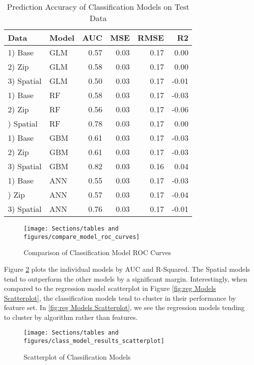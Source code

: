 \documentclass[12pt,]{article}
\begin{document}
\begin{table}

\caption{\label{tab:Class Model Compare}\label{tab:ClassModelTable} Prediction Accuracy of Classification Models on Test Data}
\centering
\begin{tabular}[t]{llrrrr}
\toprule
Data & Model & AUC & MSE & RMSE & R2\\
\midrule
1) Base & GLM & 0.57 & 0.03 & 0.17 & 0.00\\
2) Zip & GLM & 0.58 & 0.03 & 0.17 & 0.00\\
3) Spatial & GLM & 0.50 & 0.03 & 0.17 & -0.01\\
1) Base & RF & 0.58 & 0.03 & 0.17 & -0.03\\
2) Zip & RF & 0.56 & 0.03 & 0.17 & -0.06\\
\addlinespace
3) Spatial & RF & 0.78 & 0.03 & 0.17 & 0.00\\
1) Base & GBM & 0.61 & 0.03 & 0.17 & -0.03\\
2) Zip & GBM & 0.61 & 0.03 & 0.17 & -0.03\\
3) Spatial & GBM & 0.82 & 0.03 & 0.16 & 0.04\\
1) Base & ANN & 0.55 & 0.03 & 0.17 & -0.03\\
\addlinespace
2) Zip & ANN & 0.57 & 0.03 & 0.17 & -0.04\\
3) Spatial & ANN & 0.76 & 0.03 & 0.17 & -0.01\\
\bottomrule
\end{tabular}
\end{table}

\begin{figure}[H]
\texttt{[image: Sections/tables and figures/compare\_model\_roc\_curves]} \caption{Comparison of Classification Model ROC Curves}\label{fig:Model AUC Comparrison}
\end{figure}

\noindent Figure \ref{fig:Class Models Scatterplot} plots the individual
models by AUC and R-Squared. The Spatial models tend to outperform the
other models by a significant margin. Interestingly, when compared to
the regression model scatterplot in Figure
\ref{fig:reg Models Scatterplot}, the classification models tend to
cluster in their performance by feature set. In
\ref{fig:reg Models Scatterplot}, we see the regression models tending
to cluster by algorithm rather than features.

\begin{figure}[H]
\texttt{[image: Sections/tables and figures/class\_model\_results\_scatterplot]} \caption{Scatterplot of Classification Models}\label{fig:Class Models Scatterplot}
\end{figure}
\end{document}
